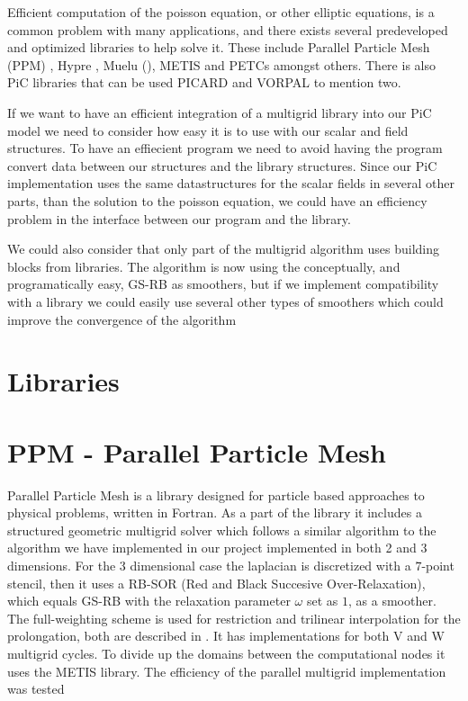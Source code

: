 

Efficient computation of the poisson equation, or other elliptic equations, is a common problem with many applications, and there exists several predeveloped and optimized libraries to help solve it. These include Parallel Particle Mesh (PPM) \citep{sbalzarini_ppm_2006}, Hypre \citep{falgout_hypre:_2002}, Muelu (), METIS \citep{_fast_????} and PETCs \citep{_manual.pdf_????} amongst others. There is also PiC libraries that can be used PICARD and VORPAL to mention two.

If we want to have an efficient integration of a multigrid library into our PiC model we need to consider how easy it is to use with our scalar and field structures. To have an effiecient program we need to avoid having the program convert data between our structures and the library structures. Since our PiC implementation uses the same datastructures for the scalar fields in several other parts, than the solution to the poisson equation, we could have an efficiency problem in the interface between our program and the library.

We could also consider that only part of the multigrid algorithm uses building blocks from libraries. The algorithm is now using the conceptually, and programatically easy, GS-RB as smoothers, but if we implement compatibility with a library we could easily use several other types of smoothers which could improve the convergence of the algorithm

\section{Libraries}

\section{PPM - Parallel Particle Mesh}
Parallel Particle Mesh is a library designed for particle based approaches to physical problems, written in Fortran. As a part of the library it includes a structured geometric multigrid solver which follows a similar algorithm to the algorithm we have implemented in our project implemented in both 2 and 3 dimensions. For the 3 dimensional case the laplacian is discretized with a \(7\)-point stencil, then it uses a RB-SOR (Red and Black Succesive Over-Relaxation), which equals GS-RB with the relaxation parameter \(\omega\) set as \(1\), as a smoother. The full-weighting scheme is used for restriction and trilinear interpolation for the prolongation, both are described in \citep{trottenberg_multigrid_2000}. It has implementations for both V and W multigrid cycles. To divide up the domains between the computational nodes it uses the METIS library. The efficiency of the parallel multigrid implementation was tested

